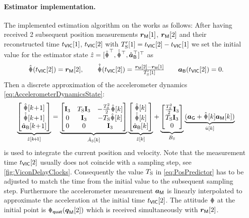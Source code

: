 \paragraph{Estimator implementation.}
The implemented estimation algorithm on the \microcontroller works as follows:
After having received 2 subsequent position measurements $\boldsymbol{r}_{\mathsf{M}}[1]$, $\boldsymbol{r}_{\mathsf{M}}[2]$ and their reconstructed time $t_{\mathsf{VIC}}[1]$, $t_{\mathsf{VIC}}[2]$ with $T_{\mathrm{S}}'[1]=t_{\mathsf{VIC}}[2]-t_{\mathsf{VIC}}[1]$ we set the initial value for the estimator state $\hat{z} = [\rObs^\top, \rdObs^\top, \aIMUBObs^\top]^\top$ as
\begin{align}
 \rObs(\tVIC[2]) = \rVIC[2], 
\qquad
 \rdObs(\tVIC[2]) = \tfrac{\rVIC[2]-\rVIC[1]}{\Ts'[1]}
\qquad
 \aIMUB(\tVIC[2]) = 0.
\end{align}
Then a discrete approximation of the accelerometer dynamics \eqref{eq:AccelerometerDynamicsState}:
\begin{align}\label{eq:PosPredictor}
 \underbrace{\begin{bmatrix} \rObs[\kPlusOne] \\ \rdObs[\kPlusOne] \\ \aIMUBObs[\kPlusOne] \end{bmatrix}}_{\hat{z}[\kPlusOne]}
 =
 \underbrace{\begin{bmatrix} \idMat[3] & \Ts\idMat[3] & -\tfrac{\Ts^2}{2}\RObs[k] \\ 0 & \idMat[3] & -\Ts\RObs[k] \\ 0 & 0 & \idMat[3] \end{bmatrix}}_{\hat{A}_\idxSamp[k]}
 \underbrace{\begin{bmatrix} \rObs[k] \\ \rdObs[k] \\ \aIMUBObs[k] \end{bmatrix}}_{\hat{z}[k]}
 +
 \underbrace{\begin{bmatrix} \tfrac{\Ts^2}{2}\idMat[3] \\ \Ts \idMat[3] \\ 0 \end{bmatrix}}_{B_\idxSamp}
 \underbrace{(\gravityAcc + \RObs[k] \aIMU[k])}_{\hat{u}[k]}
\end{align}
is used to integrate the current position and velocity.
Note that the measurement time $t_{\mathsf{VIC}}[2]$ usually does not coincide with a sampling step, see \autoref{fig:ViconDelayClocks}.
Consequently the value $T_{\mathrm{S}}$ in \eqref{eq:PosPredictor} has to be adjusted to match the time from the initial value to the subsequent sampling step.
Furthermore the accelerometer measurement $\boldsymbol{a}_{\mathsf{M}}$ is linearly interpolated to approximate the acceleration at the initial time $t_{\mathsf{VIC}}[2]$.
The attitude $\R$ at the initial point is $\RotMatQuat(\qVIC[2])$ which is received simultaneously with $\boldsymbol{r}_{\mathsf{M}}[2]$.

